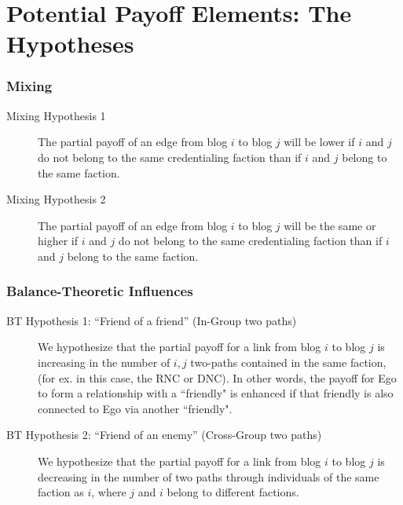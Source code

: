 \documentclass{beamer}
\begin{document}

\section{Potential Payoff Elements: The Hypotheses}

\begin{frame}
\frametitle{Mixing}

\begin{block}{}
\begin{description}
\item[Mixing Hypothesis 1] The partial payoff of an edge from blog $i$ to blog $j$ will be lower if $i$ and $j$ do not belong to the same credentialing faction than if $i$ and $j$ belong to the same faction.
\item[Mixing Hypothesis 2] The partial payoff of an edge from blog $i$ to blog $j$ will be the same or higher if $i$ and $j$ do not belong to the same credentialing faction than if $i$ and $j$ belong to the same faction.
\end{description}
\end{block}

\end{frame}


\begin{frame}
\frametitle{Balance-Theoretic Influences}

\begin{block}{}
\begin{description}
\item[BT Hypothesis 1: ``Friend of a friend'' (In-Group two paths)] We hypothesize that the partial payoff for a link from blog $i$ to blog $j$ is increasing in the number of $i,j$ two-paths contained in the same faction, (for ex. in this case, the RNC or DNC).  In other words, the payoff for Ego to form a relationship with a ``friendly" is enhanced if that friendly is also connected to Ego via another ``friendly".


\item[BT Hypothesis 2: ``Friend of an enemy'' (Cross-Group two paths)] We hypothesize that the partial payoff for a link from blog $i$ to blog $j$ is decreasing in the number of two paths through individuals of the same faction as $i$, where $j$ and $i$ belong to different factions. 

\end{description}

\end{block}

\end{frame}
\end{document}
